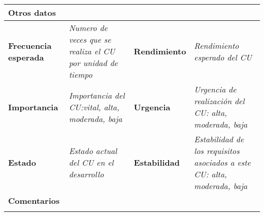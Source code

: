 \begin{tabular}{p{2.5cm}|p{4cm}|p{2.5cm}|p{4cm}}
\multicolumn{4}{p{15cm}}{\textbf{Otros datos}} \\ \hline
\textbf{Frecuencia esperada} & \textit{Numero de veces que se realiza el CU por unidad de tiempo} & \textbf{Rendimiento} & \textit{Rendimiento esperado del CU} \\ \hline 
\textbf{Importancia} & \textit{Importancia del CU:vital, alta, moderada, baja} & \textbf{Urgencia} & \textit{Urgencia de realización del CU: alta, moderada, baja} \\ \hline
\textbf{Estado} & \textit{Estado actual del CU en el desarrollo} & \textbf{Estabilidad} & \textit{Estabilidad de los requisitos asociados a este CU: alta, moderada, baja} \\ \hline
\multicolumn{4}{p{15cm}}{\textbf{Comentarios}} \\ \hline
\multicolumn{4}{p{15cm}}{} \\ \hline
\end{tabular}

